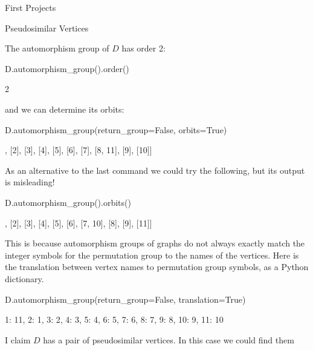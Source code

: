 \begin{chap}{First Projects}
\begin{sect}{Pseudosimilar Vertices}
\begin{para}
The automorphism group of $D$ has order 2:
\end{para}
%
\begin{sagecode}
\begin{sageinput}
D.automorphism_group().order()
\end{sageinput}
\begin{sageoutput}
2
\end{sageoutput}
\end{sagecode}
%
\begin{para}
and we can determine its orbits:
\end{para}
%
\begin{sagecode}
\begin{sageinput}
D.automorphism_group(return_group=False, orbits=True)
\end{sageinput}
\begin{sageoutput}
[[1], [2], [3], [4], [5], [6], [7], [8, 11], [9], [10]]
\end{sageoutput}
\end{sagecode}
%
\begin{para}
As an alternative to the last command we could try the following, but its
output is misleading!
\end{para}
%
\begin{sagecode}
\begin{sageinput}
D.automorphism_group().orbits()
\end{sageinput}
\begin{sageoutput}
[[1], [2], [3], [4], [5], [6], [7, 10], [8], [9], [11]]
\end{sageoutput}
\end{sagecode}
%
\begin{para}
This is because automorphism groups of graphs do not always exactly match the integer symbols for the permutation group to the names of the vertices.  Here is the translation between vertex names to permutation group symbols, as a Python dictionary.
\end{para}
%
\begin{sagecode}
\begin{sageinput}
D.automorphism_group(return_group=False, translation=True)
\end{sageinput}
\begin{sageoutput}
{1: 11, 2: 1, 3: 2, 4: 3, 5: 4, 6: 5, 7: 6, 8: 7, 9: 8, 10: 9, 11: 10}
\end{sageoutput}
\end{sagecode}
%
\begin{para}
I claim $D$ has a pair of pseudosimilar vertices. In this case we could find them

\end{para}
\end{sect}
\end{chap}
